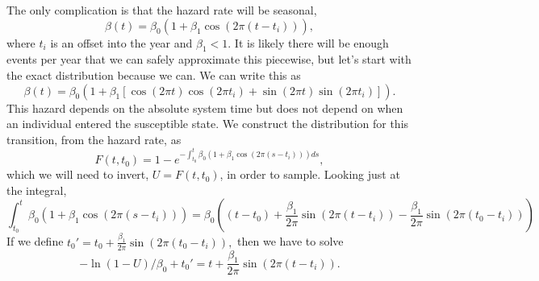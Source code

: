 \documentclass{article}
\begin{document}
The only complication is that the hazard rate will be seasonal,
\begin{equation}
  \beta(t)=\beta_0(1+\beta_1 \cos(2\pi (t-t_i))),
\end{equation}
where $t_i$ is an offset into the year and $\beta_1<1$. It is likely there will be enough
events per year that we can safely approximate this piecewise, but let's start
with the exact distribution because we can.
We can write this as
\begin{equation}
  \beta(t)=\beta_0(1+\beta_1 [\cos(2\pi t) \cos(2\pi t_i)+\sin(2\pi t) \sin(2\pi t_i)]).
\end{equation}
This hazard depends on the absolute system time but does not depend on
when an individual entered the susceptible state. We construct the
distribution for this transition, from the hazard rate, as
\begin{equation}
  F(t,t_0)=1-e^{-\int_{t_0}^t\beta_0(1+\beta_1 \cos(2\pi (s-t_i)))ds},
\end{equation}
which we will need to invert, $U=F(t,t_0)$, in order to sample.
Looking just at the integral,
\begin{equation}
  \int_{t_0}^t\beta_0(1+\beta_1 \cos(2\pi (s-t_i)))=\beta_0\left((t-t_0)+\frac{\beta_1}{2\pi}\sin(2\pi (t-t_i))-\frac{\beta_1}{2\pi}\sin(2\pi (t_0-t_i))\right)
\end{equation}
If we define $t_0'=t_0+\frac{\beta_1}{2\pi}\sin(2\pi (t_0-t_i)),$ then we
have to solve
\begin{equation}
  -\ln(1-U)/\beta_0+t_0'=t+\frac{\beta_1}{2\pi}\sin(2\pi (t-t_i)).
\end{equation}







\end{document}
